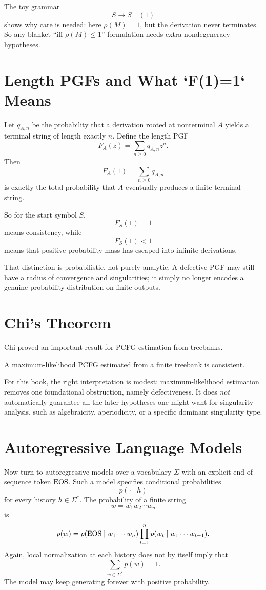 The toy grammar
\[
  S \to S \quad (1)
\]
shows why care is needed: here $\rho(M)=1$, but the derivation never terminates. So any blanket ``iff $\rho(M) \le 1$'' formulation needs extra nondegeneracy hypotheses.

\section{Length PGFs and What `F(1)=1` Means}

Let $q_{A,n}$ be the probability that a derivation rooted at nonterminal $A$ yields a terminal string of length exactly $n$. Define the length PGF
\[
  F_A(z) = \sum_{n \ge 0} q_{A,n} z^n.
\]
Then
\[
  F_A(1) = \sum_{n \ge 0} q_{A,n}
\]
is exactly the total probability that $A$ eventually produces a finite terminal string.

So for the start symbol $S$,
\[
  F_S(1)=1
\]
means consistency, while
\[
  F_S(1)<1
\]
means that positive probability mass has escaped into infinite derivations.

That distinction is probabilistic, not purely analytic. A defective PGF may still have a radius of convergence and singularities; it simply no longer encodes a genuine probability distribution on finite outputs.

\section{Chi's Theorem}

Chi proved an important result for PCFG estimation from treebanks.

\begin{theorem}
A maximum-likelihood PCFG estimated from a finite treebank is consistent.
\end{theorem}

For this book, the right interpretation is modest: maximum-likelihood estimation removes one foundational obstruction, namely defectiveness. It does \emph{not} automatically guarantee all the later hypotheses one might want for singularity analysis, such as algebraicity, aperiodicity, or a specific dominant singularity type.

\section{Autoregressive Language Models}

Now turn to autoregressive models over a vocabulary $\Sigma$ with an explicit end-of-sequence token $\operatorname{EOS}$. Such a model specifies conditional probabilities
\[
  p(\cdot \mid h)
\]
for every history $h \in \Sigma^*$. The probability of a finite string
\[
  w = w_1 w_2 \cdots w_n
\]
is
\[
  p(w) = p(\operatorname{EOS} \mid w_1\cdots w_n) \prod_{t=1}^n p(w_t \mid w_1\cdots w_{t-1}).
\]
Again, local normalization at each history does not by itself imply that
\[
  \sum_{w \in \Sigma^*} p(w) = 1.
\]
The model may keep generating forever with positive probability.

